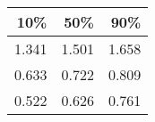 \begin{table}[ht]
\centering
\begin{tabular}{rrr}
  \hline
10\% & 50\% & 90\% \\ 
  \hline
1.341 & 1.501 & 1.658 \\ 
  0.633 & 0.722 & 0.809 \\ 
  0.522 & 0.626 & 0.761 \\ 
   \hline
\end{tabular}
\end{table}
